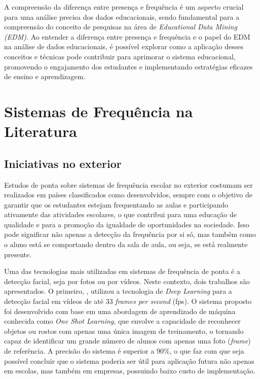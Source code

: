 A compreensão da diferença entre presença e frequência é um aspecto crucial para uma análise precisa dos dados educacionais, sendo fundamental para a compreensão do conceito de pesquisas na área de \textit{Educational Data Mining (EDM)}. Ao entender a diferença entre presença e frequência e o papel do EDM na análise de dados educacionais, é possível explorar como a aplicação desses conceitos e técnicas pode contribuir para aprimorar o sistema educacional, promovendo o engajamento dos estudantes e implementando estratégias eficazes de ensino e aprendizagem.


\section{Sistemas de Frequência na Literatura}


\subsection{Iniciativas no exterior}
\label{sec:exterior}

Estudos de ponta sobre sistemas de frequência escolar no exterior costumam ser realizados em países classificados como desenvolvidos, sempre com o objetivo de garantir que os estudantes estejam frequentando as aulas e participando ativamente das atividades escolares, o que contribui para uma educação de qualidade e para a promoção da igualdade de oportunidades na sociedade. Isso pode significar não apenas a detecção da frequência por si só, mas também como o aluno está se comportando dentro da sala de aula, ou seja, se está realmente presente.

Uma das tecnologias mais utilizadas em sistemas de frequência de ponta é a detecção facial, seja por fotos ou por vídeos. Neste contexto, dois trabalhos são apresentados. O primeiro, \cite{bhat:2020}, utilizou a tecnologia de \textit{Deep Learning} para a detecção facial em vídeos de até 33 \textit{frames per second} (fps). O sistema proposto foi desenvolvido com base em uma abordagem de aprendizado de máquina conhecida como \textit{One Shot Learning}, que envolve a capacidade de reconhecer objetos ou rostos com apenas uma única imagem de treinamento, o tornando capaz de identificar um grande número de alunos com apenas uma foto (\textit{frame}) de referência. A precisão do sistema é superior a 90\%, o que faz com que seja possível concluir que o sistema poderia ser útil para aplicação futura não apenas em escolas, mas também em empresas, possuindo baixo custo de implementação.


